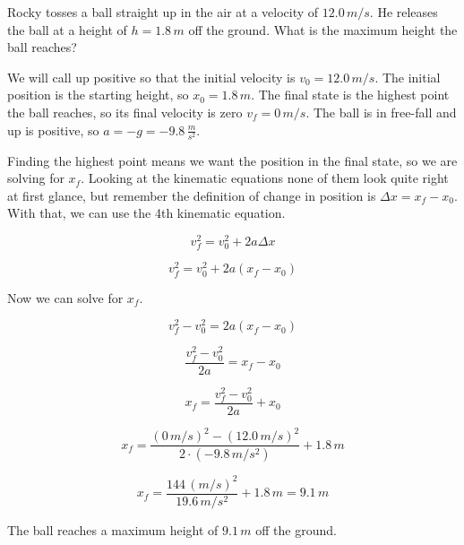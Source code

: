 \documentclass[12pt]{book}
\begin{document}
\begin{exampleblock}

Rocky tosses a ball straight up in the air at a velocity of $12.0 \, m/s$. He releases the ball at a height of $h = 1.8 \, m$ off the ground. What is the maximum height the ball reaches?

\hspace{10pt}

We will call up positive so that the initial velocity is $v_0 = 12.0 \, m/s$. The initial position is the starting height, so $x_0 = 1.8 \, m$. The final state is the highest point the ball reaches, so its final velocity is zero $v_f = 0 \, m/s$. The ball is in free-fall and up is positive, so $a = -g = -9.8 \, \frac{m}{s^2}$.

Finding the highest point means we want the position in the final state, so we are solving for $x_f$. Looking at the kinematic equations none of them look quite right at first glance, but remember the definition of change in position is $\Delta x = x_f - x_0$. With that, we can use the 4th kinematic equation.

\begin{equation}
v_f^2 = v_0^2 + 2 a \Delta x
\end{equation}

\begin{equation}
v_f^2 = v_0^2 + 2 a (x_f - x_0)
\end{equation}

Now we can solve for $x_f$.

\begin{equation}
v_f^2 - v_0^2 = 2 a (x_f - x_0)
\end{equation}

\begin{equation}
\frac{v_f^2 - v_0^2}{2 a} = x_f - x_0
\end{equation}

\begin{equation}
x_f = \frac{v_f^2 - v_0^2}{2 a} + x_0
\end{equation}

\begin{equation}
x_f = \frac{(0 \, m/s)^2 - (12.0 \, m/s)^2}{2 \cdot (-9.8 \, m/s^2)} + 1.8 \, m
\end{equation}

\begin{equation}
x_f = \frac{144 \, (m/s)^2}{19.6 \, m/s^2} + 1.8 \, m = 9.1 \, m
\end{equation}

The ball reaches a maximum height of $9.1 \, m$ off the ground.

\end{exampleblock}
\end{document}
